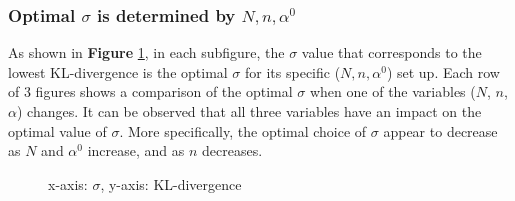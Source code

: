 \documentclass[11pt, oneside]{article}   	%
\begin{document}
\subsubsection{Optimal $\sigma$ is determined by $N, n, \alpha^0$}
As shown in \textbf{Figure} \ref{fig:sigmafunction}, in each subfigure, the $\sigma$ value that corresponds to the lowest KL-divergence is the optimal $\sigma$ for its specific ($N, n, \alpha^0$) set up. Each row of 3 figures shows a comparison of the optimal $\sigma$ when one of the variables ($N$, $n$, $\alpha$) changes. It can be observed that all three variables have an impact on the optimal value of $\sigma$. More specifically, the optimal choice of $\sigma$ appear to decrease as $N$ and $\alpha^0$ increase, and as $n$ decreases.
\begin{figure}[h!]
\caption{x-axis: $\sigma$, y-axis: KL-divergence}
\label{fig:sigmafunction}
\end{figure}
\end{document}
